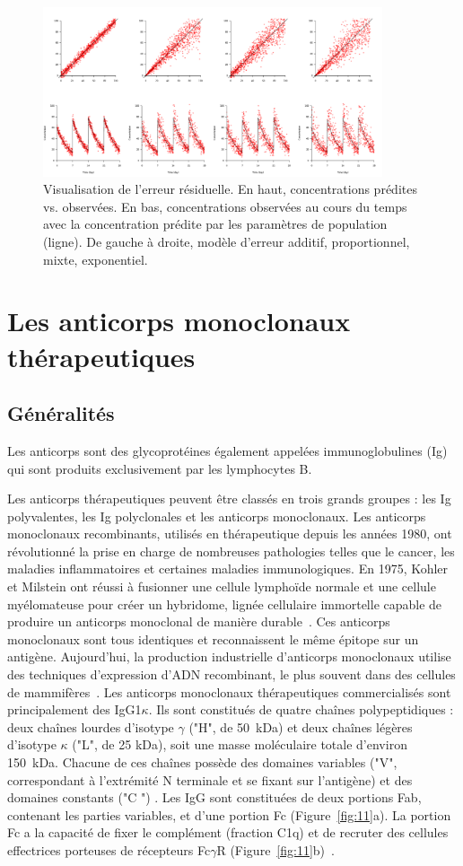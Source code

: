 \begin{figure}[htbp]
	\centering
		\includegraphics[width=10cm]{figures/raster/FIG_10}
	\caption[Visualisation de l'erreur résiduelle.]{Visualisation de l'erreur résiduelle. En haut, concentrations prédites vs. observées. En bas, concentrations observées au cours du temps avec la concentration prédite par les paramètres de population (ligne). De gauche à droite, modèle d'erreur additif, proportionnel, mixte, exponentiel.}
	\label{fig:10}
\end{figure}

\section{Les anticorps monoclonaux thérapeutiques}
\subsection{Généralités}
Les anticorps sont des glycoprotéines également appelées immunoglobulines (Ig) qui sont produits exclusivement par les lymphocytes B.

Les anticorps thérapeutiques peuvent être classés en trois grands groupes : les Ig polyvalentes, les Ig polyclonales et les anticorps monoclonaux. Les anticorps monoclonaux recombinants, utilisés en thérapeutique depuis les années 1980, ont révolutionné la prise en charge de nombreuses pathologies telles que le cancer, les maladies inflammatoires et certaines maladies immunologiques. En 1975, Kohler et Milstein ont réussi à fusionner une cellule lymphoïde normale et une cellule myélomateuse pour créer un hybridome, lignée cellulaire immortelle capable de produire un anticorps monoclonal de manière durable~\citep{REF13}. Ces anticorps monoclonaux sont tous identiques et reconnaissent le même épitope sur un antigène. Aujourd'hui, la production industrielle d'anticorps monoclonaux utilise des techniques d'expression d'ADN recombinant, le plus souvent dans des cellules de mammifères~\citep{REF14, REF15}. Les anticorps monoclonaux thérapeutiques commercialisés sont principalement des IgG1$\kappa$. Ils sont constitués de quatre chaînes polypeptidiques : deux chaînes lourdes d'isotype $\gamma$ ("H", de 50~kDa) et deux chaînes légères d'isotype $\kappa$ ("L", de 25 kDa), soit une masse moléculaire totale d'environ 150~kDa. Chacune de ces chaînes possède des domaines variables ("V", correspondant à l'extrémité N terminale et se fixant sur l'antigène) et des domaines constants ("C ") . Les IgG sont constituées de deux portions Fab, contenant les parties variables, et d'une portion Fc (Figure~\ref{fig:11}a). La portion Fc a la capacité de fixer le complément (fraction C1q) et de recruter des cellules effectrices porteuses de récepteurs Fc$\gamma$R (Figure~\ref{fig:11}b)~\citep{REF16}.

